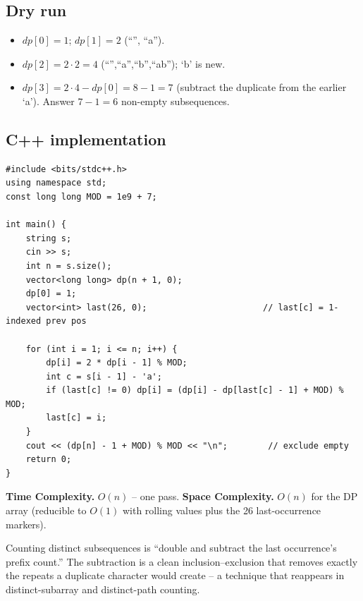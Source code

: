 \subsection*{Dry run}


\begin{itemize}
  \item $\textit{dp}[0]=1$; $\textit{dp}[1]=2$ (``'', ``a'').
  \item $\textit{dp}[2]=2\cdot2=4$ (``'',``a'',``b'',``ab''); `b' is new.
  \item $\textit{dp}[3]=2\cdot4-\textit{dp}[0]=8-1=7$ (subtract the
        duplicate from the earlier `a'). Answer $7-1=6$ non-empty
        subsequences.
\end{itemize}

\subsection*{C++ implementation}

\begin{lstlisting}
#include <bits/stdc++.h>
using namespace std;
const long long MOD = 1e9 + 7;

int main() {
    string s;
    cin >> s;
    int n = s.size();
    vector<long long> dp(n + 1, 0);
    dp[0] = 1;
    vector<int> last(26, 0);                       // last[c] = 1-indexed prev pos

    for (int i = 1; i <= n; i++) {
        dp[i] = 2 * dp[i - 1] % MOD;
        int c = s[i - 1] - 'a';
        if (last[c] != 0) dp[i] = (dp[i] - dp[last[c] - 1] + MOD) % MOD;
        last[c] = i;
    }
    cout << (dp[n] - 1 + MOD) % MOD << "\n";        // exclude empty
    return 0;
}
\end{lstlisting}

\begin{complexitybox}
\textbf{Time Complexity.} $O(n)$ -- one pass. \textbf{Space Complexity.}
$O(n)$ for the DP array (reducible to $O(1)$ with rolling values plus the
26 last-occurrence markers).
\end{complexitybox}

\begin{takeawaybox}
Counting distinct subsequences is ``double and subtract the last
occurrence's prefix count.'' The subtraction is a clean inclusion--exclusion
that removes exactly the repeats a duplicate character would create -- a
technique that reappears in distinct-subarray and distinct-path counting.
\end{takeawaybox}

